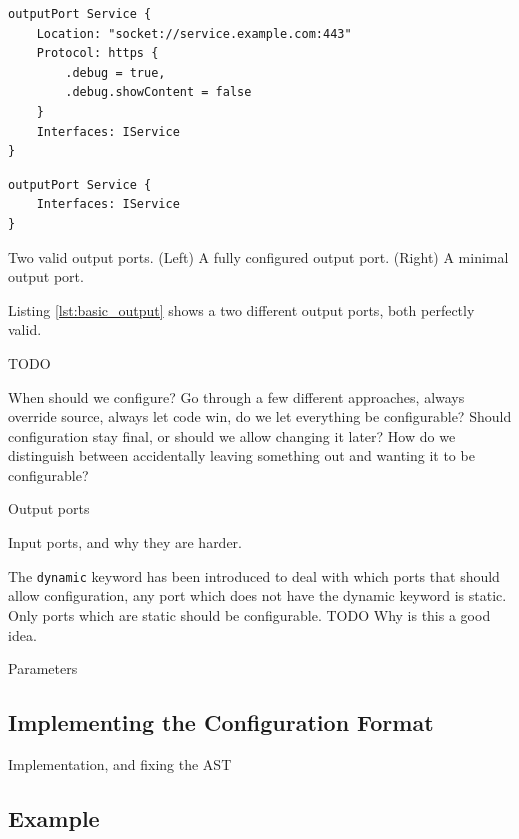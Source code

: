 \begin{listing}[H]
\begin{multicols}{2}
\begin{verbatim}
outputPort Service {
    Location: "socket://service.example.com:443"
    Protocol: https {
        .debug = true,
        .debug.showContent = false
    }
    Interfaces: IService
}
\end{verbatim}

\columnbreak

\begin{verbatim}
outputPort Service {
    Interfaces: IService
}
\end{verbatim}

\end{multicols}

\caption{
    Two valid output ports.
    (Left) A fully configured output port.
    (Right) A minimal output port.
}

\label{lst:basic_output}
\end{listing}

Listing \ref{lst:basic_output} shows a two different output ports, both
perfectly valid.

TODO

When should we configure? Go through a few different approaches, always
override source, always let code win, do we let everything be configurable?
Should configuration stay final, or should we allow changing it later?  How do
we distinguish between accidentally leaving something out and wanting it to be
configurable?

Output ports

Input ports, and why they are harder.

The \texttt{dynamic} keyword has been introduced to deal with which
ports that should allow configuration, any port which does not have the dynamic
keyword is static. Only ports which are static should be configurable. TODO Why
is this a good idea.

Parameters

\subsection{Implementing the Configuration Format}

Implementation, and fixing the AST

\subsection{Example}

